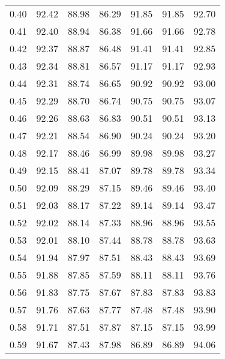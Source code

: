 \begin{tabular}{|c|c|c|c|c|c|c|}
      0.40 &     92.42 &     88.98 &      86.29 &   91.85 &      91.85 &         92.70 \\
      0.41 &     92.40 &     88.94 &      86.38 &   91.66 &      91.66 &         92.78 \\
      0.42 &     92.37 &     88.87 &      86.48 &   91.41 &      91.41 &         92.85 \\
      0.43 &     92.34 &     88.81 &      86.57 &   91.17 &      91.17 &         92.93 \\
      0.44 &     92.31 &     88.74 &      86.65 &   90.92 &      90.92 &         93.00 \\
      0.45 &     92.29 &     88.70 &      86.74 &   90.75 &      90.75 &         93.07 \\
      0.46 &     92.26 &     88.63 &      86.83 &   90.51 &      90.51 &         93.13 \\
      0.47 &     92.21 &     88.54 &      86.90 &   90.24 &      90.24 &         93.20 \\
      0.48 &     92.17 &     88.46 &      86.99 &   89.98 &      89.98 &         93.27 \\
      0.49 &     92.15 &     88.41 &      87.07 &   89.78 &      89.78 &         93.34 \\
      0.50 &     92.09 &     88.29 &      87.15 &   89.46 &      89.46 &         93.40 \\
      0.51 &     92.03 &     88.17 &      87.22 &   89.14 &      89.14 &         93.47 \\
      0.52 &     92.02 &     88.14 &      87.33 &   88.96 &      88.96 &         93.55 \\
      0.53 &     92.01 &     88.10 &      87.44 &   88.78 &      88.78 &         93.63 \\
      0.54 &     91.94 &     87.97 &      87.51 &   88.43 &      88.43 &         93.69 \\
      0.55 &     91.88 &     87.85 &      87.59 &   88.11 &      88.11 &         93.76 \\
      0.56 &     91.83 &     87.75 &      87.67 &   87.83 &      87.83 &         93.83 \\
      0.57 &     91.76 &     87.63 &      87.77 &   87.48 &      87.48 &         93.90 \\
      0.58 &     91.71 &     87.51 &      87.87 &   87.15 &      87.15 &         93.99 \\
      0.59 &     91.67 &     87.43 &      87.98 &   86.89 &      86.89 &         94.06 \\

\end{tabular}
